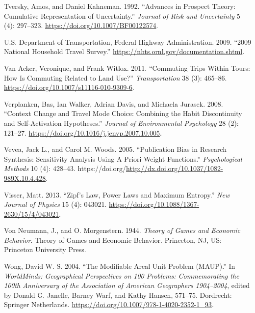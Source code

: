 \documentclass[
  11pt,
  openany]{memoir}
\newlength{\cslhangindent}
\newlength{\cslentryspacingunit} %
\newenvironment{CSLReferences}[2] %
 {%
  \setlength{\parindent}{0pt}
  \ifodd #1
  \let\oldpar\par
  \def\par{\hangindent=\cslhangindent\oldpar}
  \fi
  \setlength{\parskip}{#2\cslentryspacingunit}
 }%
 {}
\begin{document}
\begin{CSLReferences}{1}{0}
\leavevmode{}%
Tversky, Amos, and Daniel Kahneman. 1992. {``Advances in Prospect Theory: Cumulative Representation of Uncertainty.''} \emph{Journal of Risk and Uncertainty} 5 (4): 297--323. \url{https://doi.org/10.1007/BF00122574}.

\leavevmode{}%
U.S. Department of Transportation, Federal Highway Administration. 2009. {``2009 {National Household Travel Survey}.''} \url{https://nhts.ornl.gov/documentation.shtml}.

\leavevmode{}%
Van Acker, Veronique, and Frank Witlox. 2011. {``Commuting Trips Within Tours: How Is Commuting Related to Land Use?''} \emph{Transportation} 38 (3): 465--86. \url{https://doi.org/10.1007/s11116-010-9309-6}.

\leavevmode{}%
Verplanken, Bas, Ian Walker, Adrian Davis, and Michaela Jurasek. 2008. {``Context Change and Travel Mode Choice: Combining the Habit Discontinuity and Self-Activation Hypotheses.''} \emph{Journal of Environmental Psychology} 28 (2): 121--27. \url{https://doi.org/10.1016/j.jenvp.2007.10.005}.

\leavevmode{}%
Vevea, Jack L., and Carol M. Woods. 2005. {``Publication {Bias} in {Research Synthesis}: Sensitivity {Analysis Using A Priori Weight Functions}.''} \emph{Psychological Methods} 10 (4): 428--43. https://doi.org/\url{http://dx.doi.org/10.1037/1082-989X.10.4.428}.

\leavevmode{}%
Visser, Matt. 2013. {``Zipf's Law, Power Laws and Maximum Entropy.''} \emph{New Journal of Physics} 15 (4): 043021. \url{https://doi.org/10.1088/1367-2630/15/4/043021}.

\leavevmode{}%
Von Neumann, J., and O. Morgenstern. 1944. \emph{Theory of Games and Economic Behavior}. Theory of Games and Economic Behavior. {Princeton, NJ, US}: {Princeton University Press}.

\leavevmode{}%
Wong, David W. S. 2004. {``The {Modifiable Areal Unit Problem} ({MAUP}).''} In \emph{{WorldMinds}: Geographical {Perspectives} on 100 {Problems}: Commemorating the 100th {Anniversary} of the {Association} of {American Geographers} 1904--2004}, edited by Donald G. Janelle, Barney Warf, and Kathy Hansen, 571--75. {Dordrecht}: {Springer Netherlands}. \url{https://doi.org/10.1007/978-1-4020-2352-1_93}.


\end{CSLReferences}
\end{document}
